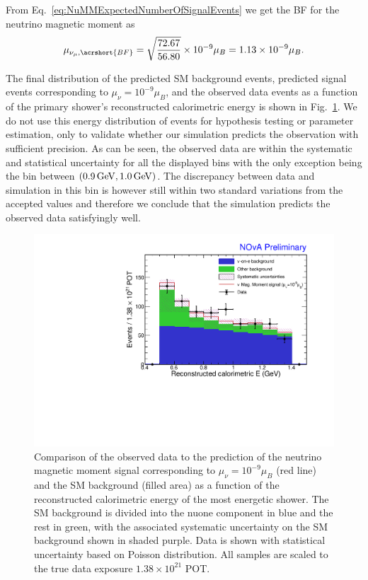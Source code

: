 From Eq.~\ref{eq:NuMMExpectedNumberOfSignalEvents} we get the \gls{BF} for the neutrino magnetic moment as
\begin{equation}
\mu_{\nu_\mu,\acrshort{BF}} = \sqrt{\frac{72.67}{56.80}} \times 10^{-9}\mu_B = 1.13\times 10^{-9}\mu_B.
\end{equation}

The final distribution of the predicted \gls{SM} background events, predicted signal events corresponding to $\mu_{\nu}=10^{-9}\mu_B$, and the observed data events as a function of the primary shower's reconstructed calorimetric energy is shown in Fig.~\ref{fig:NuMMResults_Distribution}. We do not use this energy distribution of events for hypothesis testing or parameter estimation, only to validate whether our simulation predicts the observation with sufficient precision. As can be seen, the observed data are within the systematic and statistical uncertainty for all the displayed bins with the only exception being the bin between $\left(\unit[0.9]{GeV},\unit[1.0]{GeV}\right)$. The discrepancy between data and simulation in this bin is however still within two standard variations from the accepted values and therefore we conclude that the simulation predicts the observed data satisfyingly well.

\begin{figure}[hbtp]
\centering
\includegraphics[width=\textwidth]{Plots/NuMM/Stacked.pdf}
\caption[Final prediction and data comparison]{Comparison of the observed data to the prediction of the neutrino magnetic moment signal corresponding to $\mu_\nu=10^{-9}\mu_B$ (red line) and the \acrshort{SM} background (filled area) as a function of the reconstructed calorimetric energy of the most energetic shower. The \acrshort{SM} background is divided into the \acrshort{nuone} component in blue and the rest in green, with the associated systematic uncertainty on the \acrshort{SM} background shown in shaded purple. Data is shown with statistical uncertainty based on Poisson distribution. All samples are scaled to the true data exposure $1.38\times 10^{21}$ \acrshort{POT}.}
\label{fig:NuMMResults_Distribution}
\end{figure}

